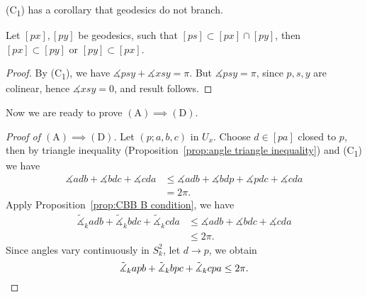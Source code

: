 (C\textsubscript{1}) has a corollary that geodesics do not branch.
\begin{prop}\label{prop:branch}
    Let $[px],[py]$ be geodesics, such that $[ps]\subset[px]\cap[py]$, then $[px]\subset[py]$ or $[py]\subset[px]$.
\end{prop}
\begin{proof}
    By (C\textsubscript{1}), we have $\measuredangle{psy}+\measuredangle{xsy}=\pi$.
    But $\measuredangle{psy}=\pi$, since $p,s,y$ are colinear, hence $\measuredangle{xsy}=0$, and result follows.
\end{proof}

Now we are ready to prove $\mathrm{(A)}\implies\mathrm{(D)}$.
\begin{proof}[Proof of $\mathrm{(A)}\implies\mathrm{(D)}$]
    Let $(p;a,b,c)$ in $U_x$.
    Choose $d\in[pa]$ closed to $p$, then by triangle inequality (Proposition~\ref{prop:angle triangle inequality}) and (C\textsubscript{1}) we have
    \begin{align*}
        \measuredangle{adb}+\measuredangle{bdc}+\measuredangle{cda}&\leq\measuredangle{adb}+\measuredangle{bdp}+\measuredangle{pdc}+\measuredangle{cda}\\
        &=2\pi.
    \end{align*}
    Apply Proposition~\ref{prop:CBB B condition}, we have
    \begin{align*}
        \tilde{\measuredangle}_kadb+\tilde{\measuredangle}_kbdc+\tilde{\measuredangle}_kcda&\leq\measuredangle{adb}+\measuredangle{bdc}+\measuredangle{cda}\\
        &\leq 2\pi.
    \end{align*}
    Since angles vary continuously in $S^2_k$, let $d\to p$, we obtain
    \[\tilde{\measuredangle}_kapb+\tilde{\measuredangle}_kbpc+\tilde{\measuredangle}_kcpa\leq 2\pi.\qedhere\]
\end{proof}

